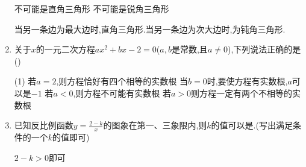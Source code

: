 \documentclass[cn,blue,12pt]{elegantbook}
\renewcommand \tkt[1]{{\CJKunderline[hidden=true, skip=true, thickness=1pt]{#1}}}
\begin{document}
\begin{enumerate}
\begin{tasks}
\task 不可能是直角三角形
\task 不可能是锐角三角形
\end{tasks}
\begin{solution}
    当另一条边为最大边时,直角三角形.当另一条边为次大边时,为钝角三角形.
\end{solution}
\item 关于\(x\)的一元二次方程\(ax^2+ bx -2 =0\)(\( a,b\)是常数,且\( a \ne 0\)),下列说法正确的是(\tkt{D})\\
    \begin{tasks}(1)
\task 若\(a =2\),则方程恰好有四个相等的实数根
\task 当\(b=0\)时,要使方程有实数根,\(a\)可以是\(-1\)
\task 若\(a<0\),则方程不可能有实数根
\task 若\(a>0\)则方程一定有两个不相等的实数根
\end{tasks}
\item 已知反比例函数\(y =\frac{2-k}{x}\)的图象在第一、三象限内,则\(k\)的值可以是\tkt{\(\tkt{-1}\)}.(写出满足条件的一个\(k\)的值即可)
\begin{solution}
        \(2-k>0\)即可
\end{solution}
\end{enumerate}
\end{document}

